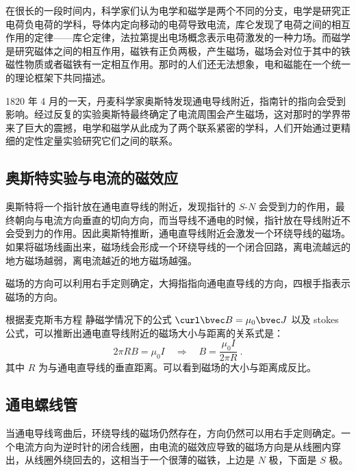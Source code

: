 

在很长的一段时间内，科学家们认为电学和磁学是两个不同的分支，电学是研究正电荷负电荷的学科，导体内定向移动的电荷导致电流，库仑发现了电荷之间的相互作用的定律——库仑定律，法拉第提出电场概念表示电荷激发的一种力场。而磁学是研究磁体之间的相互作用，磁铁有正负两极，产生磁场，磁场会对位于其中的铁磁性物质或者磁铁有一定相互作用。那时的人们还无法想象，电和磁能在一个统一的理论框架下共同描述。

1820 年 4 月的一天，丹麦科学家奥斯特发现通电导线附近，指南针的指向会受到影响。经过反复的实验奥斯特最终确定了电流周围会产生磁场，这对那时的学界带来了巨大的震撼，电学和磁学从此成为了两个联系紧密的学科，人们开始通过更精细的定性定量实验研究它们之间的联系。
\subsection{奥斯特实验与电流的磁效应}
奥斯特将一个指针放在通电直导线的附近，发现指针的 $S$-$N$ 会受到力的作用，最终朝向与电流方向垂直的切向方向，而当导线不通电的时候，指针放在导线附近不会受到力的作用。因此奥斯特推断，通电直导线附近会激发一个环绕导线的磁场。如果将磁场线画出来，磁场线会形成一个环绕导线的一个闭合回路，离电流越远的地方磁场越弱，离电流越近的地方磁场越强。

磁场的方向可以利用右手定则确定，大拇指指向通电直导线的方向，四根手指表示磁场的方向。

根据麦克斯韦方程 静磁学情况下的公式 $\curl \bvec B=\mu_0 \bvec J$ 以及 stokes 公式，可以推断出通电直导线附近的磁场大小与距离的关系式是：
\begin{equation}
2\pi R B = \mu_0 I\quad \Rightarrow\quad B=\frac{\mu_0 I }{2\pi R}~.
\end{equation}
其中 $R$ 为与通电直导线的垂直距离。可以看到磁场的大小与距离成反比。
\subsection{通电螺线管}
当通电导线弯曲后，环绕导线的磁场仍然存在，方向仍然可以用右手定则确定。一个电流方向为逆时针的闭合线圈，由电流的磁效应导致的磁场方向是从线圈内穿出，从线圈外绕回去的，这相当于一个很薄的磁铁，上边是 $N$ 极，下面是 $S$ 极。